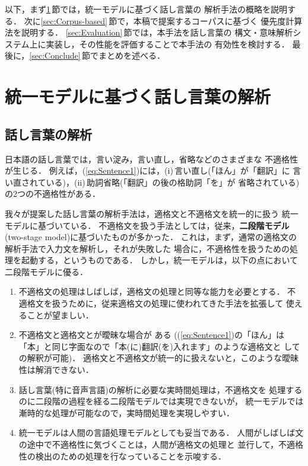 以下，まず\ref{sec:Uniform}\,節では，統一モデルに基づく話し言葉の
解析手法の概略を説明する．
次に\ref{sec:Corpus-based}\,節で，本稿で提案するコーパスに基づく
優先度計算法を説明する．
\ref{sec:Evaluation}\,節では，本手法を話し言葉の
構文・意味解析システム上に実装し，その性能を評価することで本手法の
有効性を検討する．
最後に，\ref{sec:Conclude}\,節でまとめを述べる．
\section{統一モデルに基づく話し言葉の解析}\label{sec:Uniform}

\subsection{話し言葉の解析}\label{sec:Uniform:Spoken}

日本語の話し言葉では，言い淀み，言い直し，省略などのさまざまな
不適格性が生じる．
例えば，(\ref{eq:Sentence1})には，(i)\,言い直し(「ほん」が「翻訳」に
言い直されている)，(ii)\,助詞省略(「翻訳」の後の格助詞「を」が
省略されている)の2つの不適格性がある．

我々が提案した話し言葉の解析手法は，適格文と不適格文を統一的に扱う
統一モデルに基づいている．
不適格文を扱う手法としては，従来，{\bf 二段階モデル}\,(two-stage
model)に基づいたものが多かった\cite{Jensen:CL-9-3-147,
Weischedel:CL-9-3-161,Mellish:ACL89-102}．
これは，まず，通常の適格文の解析手法で入力文を解析し，それが失敗した
場合に，不適格性を扱うための処理を起動する，というものである．
しかし，統一モデルは，以下の点において二段階モデルに優る．
\begin{enumerate}
\renewcommand{\theenumi}{}
\renewcommand{\labelenumi}{}
  \item 不適格文の処理はしばしば，適格文の処理と同等な能力を必要とする．
不適格文を扱うために，従来適格文の処理に使われてきた手法を拡張して
使えることが望ましい．
  \item 不適格文と適格文とが曖昧な場合が
ある\cite{佐川:IPSJ-NL-94-100-73} ((\ref{eq:Sentence1})の「ほん」は
「本」と同じ字面なので「本(に)翻訳(を)入れます」のような適格文と
しての解釈が可能)．
適格文と不適格文が統一的に扱えないと，このような曖昧性は解消できない．
  \item 話し言葉(特に音声言語)の解析に必要な実時間処理は，不適格文を
処理するのに二段階の過程を経る二段階モデルでは実現できないが，
統一モデルでは漸時的な処理が可能なので，実時間処理を実現しやすい．
  \item 統一モデルは人間の言語処理モデルとしても妥当である．
人間がしばしば文の途中で不適格性に気づくことは，人間が適格文の処理と
並行して，不適格性の検出のための処理を行なっていることを示唆する．
\end{enumerate}

